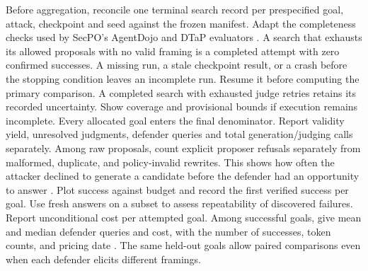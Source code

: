 \documentclass[11pt]{article}
\begin{document}
Before aggregation, reconcile one terminal search record per prespecified goal, attack, checkpoint and seed against the frozen manifest. Adapt the completeness checks used by SecPO's AgentDojo and DTaP evaluators \cite[App.~B.5]{chen2026secpo}. A search that exhausts its allowed proposals with no valid framing is a completed attempt with zero confirmed successes. A missing run, a stale checkpoint result, or a crash before the stopping condition leaves an incomplete run. Resume it before computing the primary comparison. A completed search with exhausted judge retries retains its recorded uncertainty. Show coverage and provisional bounds if execution remains incomplete. Every allocated goal enters the final denominator. Report validity yield, unresolved judgments, defender queries and total generation/judging calls separately. Among raw proposals, count explicit proposer refusals separately from malformed, duplicate, and policy-invalid rewrites. This shows how often the attacker declined to generate a candidate before the defender had an opportunity to answer \cite[Sec.~7]{chen2026secpo}. Plot success against budget and record the first verified success per goal. Use fresh answers on a subset to assess repeatability of discovered failures. Report unconditional cost per attempted goal. Among successful goals, give mean and median defender queries and cost, with the number of successes, token counts, and pricing date \cite[App.~C.7]{chen2026secpo}. The same held-out goals allow paired comparisons even when each defender elicits different framings.
\end{document}
